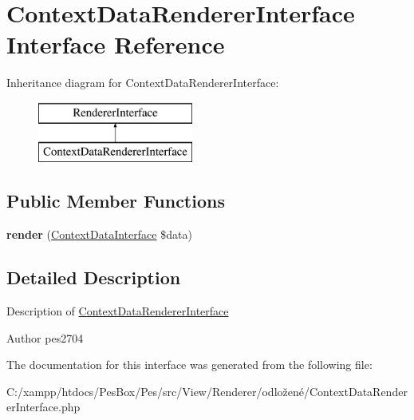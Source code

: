 \hypertarget{interface_pes_1_1_view_1_1_renderer_1_1_context_data_renderer_interface}{}\section{Context\+Data\+Renderer\+Interface Interface Reference}
\label{interface_pes_1_1_view_1_1_renderer_1_1_context_data_renderer_interface}
Inheritance diagram for Context\+Data\+Renderer\+Interface\+:\begin{figure}[H]
\begin{center}
\leavevmode
\includegraphics[height=2.000000cm]{interface_pes_1_1_view_1_1_renderer_1_1_context_data_renderer_interface}
\end{center}
\end{figure}
\subsection*{Public Member Functions}
\begin{DoxyCompactItemize}
\item 
\mbox{\label{interface_pes_1_1_view_1_1_renderer_1_1_context_data_renderer_interface_a62242a0fe42c0cf85fb1cbf95f09db6e}} 
{\bfseries render} (\mbox{\hyperlink{interface_pes_1_1_type_1_1_context_data_interface}{Context\+Data\+Interface}} \$data)
\end{DoxyCompactItemize}


\subsection{Detailed Description}
Description of \mbox{\hyperlink{interface_pes_1_1_view_1_1_renderer_1_1_context_data_renderer_interface}{Context\+Data\+Renderer\+Interface}}

\begin{DoxyAuthor}{Author}
pes2704 
\end{DoxyAuthor}


The documentation for this interface was generated from the following file\+:\begin{DoxyCompactItemize}
\item 
C\+:/xampp/htdocs/\+Pes\+Box/\+Pes/src/\+View/\+Renderer/odložené/Context\+Data\+Renderer\+Interface.\+php\end{DoxyCompactItemize}
